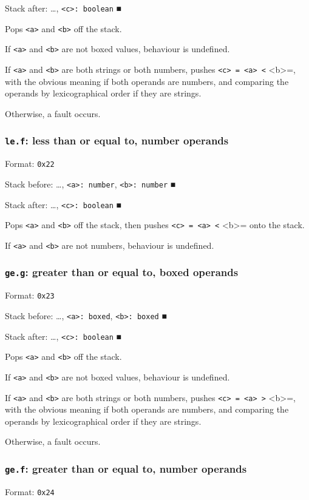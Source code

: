 \documentclass[11pt]{article}
\begin{document}
Stack after: \ldots{}​, \texttt{<c>: boolean} ■

Pops \texttt{<a>} and \texttt{<b>} off the stack.

If \texttt{<a>} and \texttt{<b>} are not boxed values, behaviour is undefined.

If \texttt{<a>} and \texttt{<b>} are both strings or both numbers, pushes
\texttt{<c> = <a> <} <b>=, with the obvious meaning if both operands are
numbers, and comparing the operands by lexicographical order if they are
strings.

Otherwise, a fault occurs.

\subsubsection{\texttt{le.f}: less than or equal to, number operands}
\label{sec:orgef83a7a}
Format: \texttt{0x22}

Stack before: \ldots{}​, \texttt{<a>: number}, \texttt{<b>: number} ■

Stack after: \ldots{}​, \texttt{<c>: boolean} ■

Pops \texttt{<a>} and \texttt{<b>} off the stack, then pushes \texttt{<c> = <a> <} <b>= onto
the stack.

If \texttt{<a>} and \texttt{<b>} are not numbers, behaviour is undefined.

\subsubsection{\texttt{ge.g}: greater than or equal to, boxed operands}
\label{sec:org7e275af}
Format: \texttt{0x23}

Stack before: \ldots{}​, \texttt{<a>: boxed}, \texttt{<b>: boxed} ■

Stack after: \ldots{}​, \texttt{<c>: boolean} ■

Pops \texttt{<a>} and \texttt{<b>} off the stack.

If \texttt{<a>} and \texttt{<b>} are not boxed values, behaviour is undefined.

If \texttt{<a>} and \texttt{<b>} are both strings or both numbers, pushes
\texttt{<c> = <a> >} <b>=, with the obvious meaning if both operands are
numbers, and comparing the operands by lexicographical order if they are
strings.

Otherwise, a fault occurs.

\subsubsection{\texttt{ge.f}: greater than or equal to, number operands}
\label{sec:org24757e3}
Format: \texttt{0x24}
\end{document}
